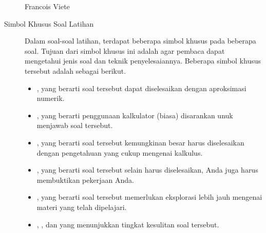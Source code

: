 \begin{description}
\begin{charbox}{Francois Viete}
	\end{charbox}
	\item[Simbol Khusus Soal Latihan] Dalam soal-soal latihan, terdapat beberapa simbol khusus pada beberapa soal. Tujuan dari simbol khusus ini adalah agar pembaca dapat mengetahui jenis soal dan teknik penyelesaiannya. Beberapa simbol khusus tersebut adalah sebagai berikut.
	\begin{itemize}
		\item \probtype{$ \approx $}, yang berarti soal tersebut dapat diselesaikan dengan aproksimasi numerik.
		\item {}, yang berarti penggunaan kalkulator (biasa) disarankan unuk menjawab soal tersebut.
		\item {}, yang berarti soal tersebut kemungkinan besar harus diselesaikan dengan pengetahuan yang cukup mengenai kalkulus.
		\item {}, yang berarti soal tersebut selain harus diselesaikan, Anda juga harus membuktikan pekerjaan Anda.
		\item {}, yang berarti soal tersebut memerlukan eksplorasi lebih jauh mengenai materi yang telah dipelajari.
		\item \probtype{*}, \probtype{**}, dan \probtype{***} yang menunjukkan tingkat kesulitan soal tersebut.
	\end{itemize}
\end{description}